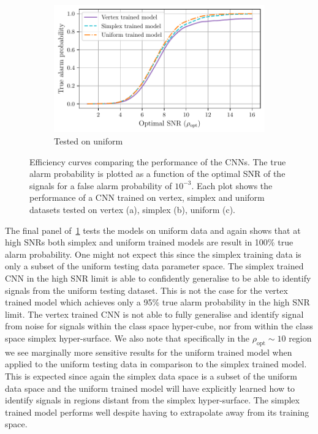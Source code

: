 \documentclass[12pt]{iopart}
\begin{document}
\begin{figure}
\begin{subfigure}{1\textwidth}
\centering
\includegraphics[scale=0.85]{figures/efficiency_curve_utest.pdf}
\caption{Tested on uniform}
\end{subfigure}

\caption{Efficiency curves comparing the performance of the \acp{CNN}. The true alarm probability is plotted as a function of the optimal \ac{SNR} of the signals for a false alarm probability of $10^{-3}$. Each plot shows the performance of a \ac{CNN} trained on vertex, simplex and uniform datasets tested on vertex (a), simplex (b), uniform (c).}
\label{fig:eff_curves}
\end{figure}

%
The final panel of~\cref{fig:eff_curves} tests the models on uniform data and again shows that at high \acp{SNR} both simplex and uniform trained models are result in 100\% true alarm probability. One might not expect this since the simplex training data is only a subset of the uniform testing data parameter space. The simplex trained \ac{CNN} in the high \ac{SNR} limit is able to confidently generalise to be able to identify signals from the uniform testing dataset. This is not the case for the vertex trained model which achieves only a 95\% true alarm probability in the high \ac{SNR} limit. The vertex trained \ac{CNN} is not able to fully generalise and identify signal from noise for signals within the class space hyper-cube, nor from within the class space simplex hyper-surface. We also note that specifically in the $\rho_{\text{opt}}\sim 10$ region we see marginally more sensitive results for the uniform trained model when applied to the uniform testing data in comparison to the simplex trained model. This is expected since again the simplex data space is a subset of the uniform data space and the uniform trained model will have explicitly learned how to identify signals in regions distant from the simplex hyper-surface. The simplex trained model performs well despite having to extrapolate away from its training space.        
\end{document}
